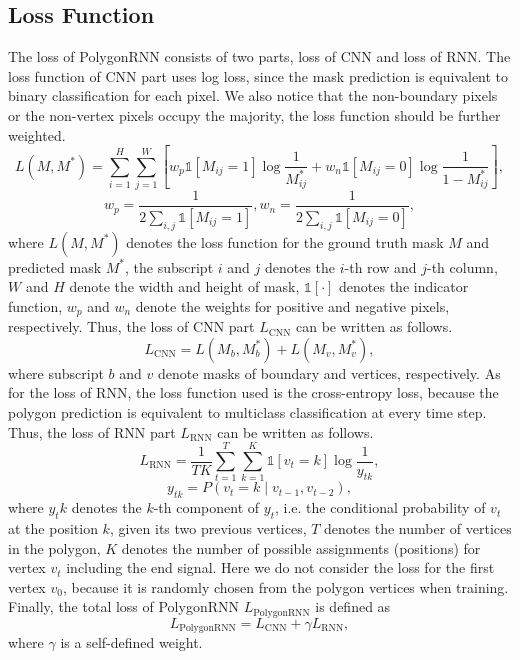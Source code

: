 \subsection{Loss Function}\label{losspoly}
The loss of PolygonRNN consists of two parts, loss of CNN and loss of RNN. The loss function of CNN part uses log loss, since the mask prediction is equivalent to binary classification for each pixel. We also notice that the non-boundary pixels or the non-vertex pixels occupy the majority, the loss function should be further weighted.
\begin{equation}
	L(M, M^*) = \sum_{i=1}^H\sum_{j=1}^W \left[w_p\mathbb{1}[M_{ij} = 1]\log{\frac{1}{M^*_{ij}}} + w_n\mathbb{1}[M_{ij} = 0]\log{\frac{1}{1-M^*_{ij}}} \right],
\end{equation}
\begin{equation}
	w_p = \frac{1}{2\sum_{i, j}\mathbb{1}[M_{ij} = 1]}, w_n = \frac{1}{2\sum_{i, j}\mathbb{1}[M_{ij} = 0]},
\end{equation}
where $L(M, M^*)$ denotes the loss function for the ground truth mask $M$ and predicted mask $M^*$, the subscript $i$ and $j$ denotes the $i$-th row and $j$-th column, $W$ and $H$ denote the width and height of mask, $\mathbb{1}[\cdot]$ denotes the indicator function, $w_p$ and $w_n$ denote the weights for positive and negative pixels, respectively. Thus, the loss of CNN part $L_{\text{CNN}}$ can be written as follows.
\begin{equation}
	L_{\text{CNN}} = L(M_b, M^*_b) + L(M_v, M^*_v),
\end{equation}
where subscript $b$ and $v$ denote masks of boundary and vertices, respectively. As for the loss of RNN, the loss function used is the cross-entropy loss, because the polygon prediction is equivalent to multiclass classification at every time step. Thus, the loss of RNN part $L_{\text{RNN}}$ can be written as follows.
\begin{equation}
	L_{\text{RNN}} = \frac{1}{TK} \sum_{t=1}^T\sum_{k=1}^K\mathbb{1}[v_{t} = k]\log{\frac{1}{y_{tk}}},
\end{equation}
\begin{equation}
	y_{tk} = P(v_t = k \mid v_{t-1}, v_{t-2}),
\end{equation}
where $y_tk$ denotes the $k$-th component of $y_t$, i.e. the conditional probability of $v_t$ at the position $k$, given its two previous vertices, $T$ denotes the number of vertices in the polygon, $K$ denotes the number of possible assignments (positions) for vertex $v_t$ including the end signal. Here we do not consider the loss for the first vertex $v_0$, because it is randomly chosen from the polygon vertices when training. Finally, the total loss of PolygonRNN $L_{\text{PolygonRNN}}$ is defined as
\begin{equation}
	L_{\text{PolygonRNN}} = L_{\text{CNN}} + \gamma L_{\text{RNN}},
\end{equation}
where $\gamma$ is a self-defined weight.

